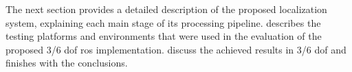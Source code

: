 The next section provides a detailed description of the proposed localization system, explaining each main stage of its processing pipeline.  describes the testing platforms and environments that were used in the evaluation of the proposed 3/6 \gls{dof} \gls{ros} implementation.  discuss the achieved results in 3/6 \gls{dof} and  finishes with the conclusions.
